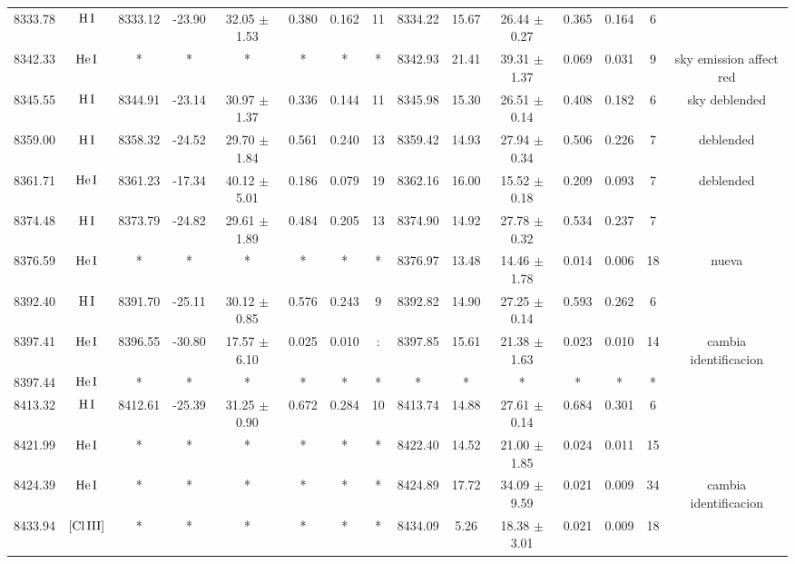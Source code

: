 \documentclass{article}
\begin{document}
\begin{table*}
\begin{adjustbox}{width=\textwidth}
\begin{tabular}{ccccccccccccccc}
8333.78 & $\mbox{H}\thinspace \mbox{I}$ & 8333.12 & -23.90 & 32.05 $\pm$ 1.53 & 0.380 & 0.162 & 11 & 8334.22 & 15.67 & 26.44 $\pm$ 0.27 & 0.365 & 0.164 & 6 &  \\
8342.33 & $\mbox{He}\thinspace \mbox{I}$ & * & * & * & * & * & * & 8342.93 & 21.41 & 39.31 $\pm$ 1.37 & 0.069 & 0.031 & 9 &  sky emission affect red \\
8345.55 & $\mbox{H}\thinspace \mbox{I}$ & 8344.91 & -23.14 & 30.97 $\pm$ 1.37 & 0.336 & 0.144 & 11 & 8345.98 & 15.30 & 26.51 $\pm$ 0.14 & 0.408 & 0.182 & 6 &  sky deblended \\
8359.00 & $\mbox{H}\thinspace \mbox{I}$ & 8358.32 & -24.52 & 29.70 $\pm$ 1.84 & 0.561 & 0.240 & 13 & 8359.42 & 14.93 & 27.94 $\pm$ 0.34 & 0.506 & 0.226 & 7 &  deblended \\
8361.71 & $\mbox{He}\thinspace \mbox{I}$ & 8361.23 & -17.34 & 40.12 $\pm$ 5.01 & 0.186 & 0.079 & 19 & 8362.16 & 16.00 & 15.52 $\pm$ 0.18 & 0.209 & 0.093 & 7 &  deblended \\
8374.48 & $\mbox{H}\thinspace \mbox{I}$ & 8373.79 & -24.82 & 29.61 $\pm$ 1.89 & 0.484 & 0.205 & 13 & 8374.90 & 14.92 & 27.78 $\pm$ 0.32 & 0.534 & 0.237 & 7 &  \\
8376.59 & $\mbox{He}\thinspace \mbox{I}$ & * & * & * & * & * & * & 8376.97 & 13.48 & 14.46 $\pm$ 1.78 & 0.014 & 0.006 & 18 &  nueva \\
8392.40 & $\mbox{H}\thinspace \mbox{I}$ & 8391.70 & -25.11 & 30.12 $\pm$ 0.85 & 0.576 & 0.243 & 9 & 8392.82 & 14.90 & 27.25 $\pm$ 0.14 & 0.593 & 0.262 & 6 &  \\
8397.41 & $\mbox{He}\thinspace \mbox{I}$ & 8396.55 & -30.80 & 17.57 $\pm$ 6.10 & 0.025 & 0.010 & : & 8397.85 & 15.61 & 21.38 $\pm$ 1.63 & 0.023 & 0.010 & 14 &  cambia identificacion \\
8397.44 & $\mbox{He}\thinspace \mbox{I}$ & * & * & * & * & * & * & * & * & * & * & * & * &  \\
8413.32 & $\mbox{H}\thinspace \mbox{I}$ & 8412.61 & -25.39 & 31.25 $\pm$ 0.90 & 0.672 & 0.284 & 10 & 8413.74 & 14.88 & 27.61 $\pm$ 0.14 & 0.684 & 0.301 & 6 &  \\
8421.99 & $\mbox{He}\thinspace \mbox{I}$ & * & * & * & * & * & * & 8422.40 & 14.52 & 21.00 $\pm$ 1.85 & 0.024 & 0.011 & 15 &  \\
8424.39 & $\mbox{He}\thinspace \mbox{I}$ & * & * & * & * & * & * & 8424.89 & 17.72 & 34.09 $\pm$ 9.59 & 0.021 & 0.009 & 34 &  cambia identificacion \\
8433.94 & $\mbox{[Cl}\thinspace \mbox{III]}$ & * & * & * & * & * & * & 8434.09 & 5.26 & 18.38 $\pm$ 3.01 & 0.021 & 0.009 & 18 &  \\

\end{tabular}
\end{adjustbox}
\end{table*}
\end{document}

